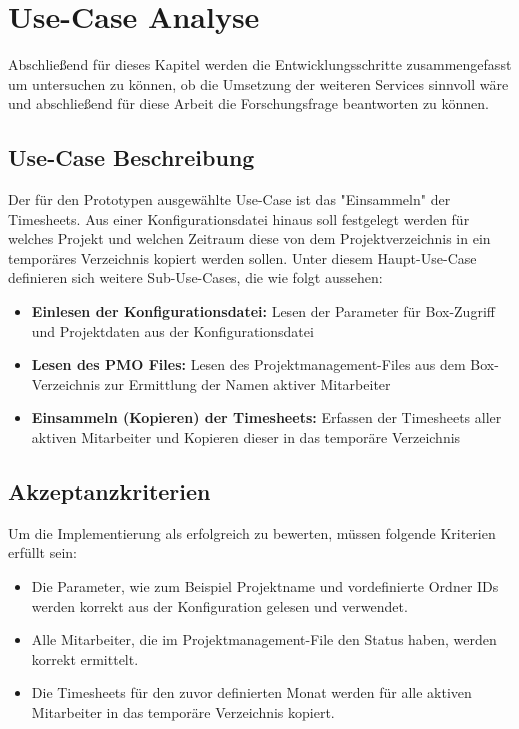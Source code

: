 \section{Use-Case Analyse}

Abschließend für dieses Kapitel werden die Entwicklungsschritte zusammengefasst um untersuchen zu können, ob die Umsetzung der weiteren Services sinnvoll wäre und abschließend für diese Arbeit die Forschungsfrage beantworten zu können.

\subsection{Use-Case Beschreibung}
Der für den Prototypen ausgewählte Use-Case ist das "Einsammeln" der Timesheets. Aus einer Konfigurationsdatei hinaus soll festgelegt werden für welches Projekt und welchen Zeitraum diese von dem Projektverzeichnis in ein temporäres Verzeichnis kopiert werden sollen. Unter diesem Haupt-Use-Case definieren sich weitere Sub-Use-Cases, die wie folgt aussehen:
\begin{itemize}
\item \textbf{Einlesen der Konfigurationsdatei:} Lesen der Parameter für Box-Zugriff und Projektdaten aus der Konfigurationsdatei
\item \textbf{Lesen des PMO Files:} Lesen des Projektmanagement-Files aus dem Box-Verzeichnis zur Ermittlung der Namen aktiver Mitarbeiter
\item \textbf{Einsammeln (Kopieren) der Timesheets:} Erfassen der Timesheets aller aktiven Mitarbeiter und Kopieren dieser in das temporäre Verzeichnis
\end{itemize}

\subsection{Akzeptanzkriterien}
Um die Implementierung als erfolgreich zu bewerten, müssen folgende Kriterien erfüllt sein:
\begin{itemize}
\item Die Parameter, wie zum Beispiel Projektname und vordefinierte Ordner IDs werden korrekt aus der Konfiguration gelesen und verwendet.
\item Alle Mitarbeiter, die im Projektmanagement-File den Status \grqq{} haben, werden korrekt ermittelt.
\item Die Timesheets für den zuvor definierten Monat werden für alle aktiven Mitarbeiter in das temporäre Verzeichnis kopiert.
\end{itemize}

